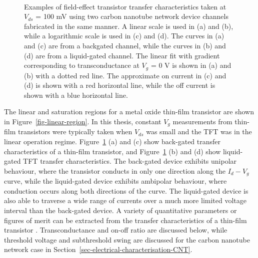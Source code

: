 \documentclass[
  a4paper,
]{scrbook}
\begin{document}
\begin{figure}
\begin{minipage}[t]{0.45\linewidth}
{{}

}

\end{minipage}%
%
\begin{minipage}[t]{0.01\linewidth}

{\centering 

~

}

\end{minipage}%

\caption{\label{fig-gating-transfer}Examples of field-effect transistor
transfer characteristics taken at \(V_{ds}\) = 100 mV using two carbon
nanotube network device channels fabricated in the same manner. A linear
scale is used in (a) and (b), while a logarithmic scale is used in (c)
and (d). The curves in (a) and (c) are from a backgated channel, while
the curves in (b) and (d) are from a liquid-gated channel. The linear
fit with gradient corresponding to transconductance at \(V_g\) = 0 V is
shown in (a) and (b) with a dotted red line. The approximate on current
in (c) and (d) is shown with a red horizontal line, while the off
current is shown with a blue horizontal line.}

\end{figure}

The linear and saturation regions for a metal oxide thin-film transistor
are shown in Figure~\ref{fig-linear-region}. In this thesis, constant
\(V_g\) measurements from thin-film transistors were typically taken
when \(V_{ds}\) was small and the TFT was in the linear operation
regime. Figure~\ref{fig-gating-transfer} (a) and (c) show back-gated
transfer characteristics of a thin-film transistor, and
Figure~\ref{fig-gating-transfer} (b) and (d) show liquid-gated TFT
transfer characteristics. The back-gated device exhibits unipolar
behaviour, where the transistor conducts in only one direction along the
\(I_d - V_g\) curve, while the liquid-gated device exhibits ambipolar
behaviour, where conduction occurs along both directions of the curve.
The liquid-gated device is also able to traverse a wide range of
currents over a much more limited voltage interval than the back-gated
device. A variety of quantitative parameters or figures of merit can be
extracted from the transfer characteristics of a thin-film transistor
\autocite{Petti2016}. Transconductance and on-off ratio are discussed
below, while threshold voltage and subthreshold swing are discussed for
the carbon nanotube network case in
Section~\ref{sec-electrical-characterisation-CNT}.
\end{document}
